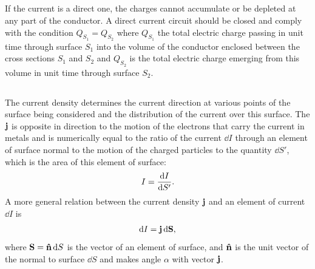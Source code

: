 \subsection{}\label{20.2.2} If the current is a direct one, the charges cannot accumulate or be depleted at any part of the conductor. A direct current circuit should be closed and comply with the condition $Q_{S_{1}} = Q_{S_{2}}$ where $Q_{S_{1}}$ the total electric charge passing in unit time through surface $S_{1}$ into the volume of the conductor enclosed between the cross sections $S_{1}$ and $S_{2}$ and $Q_{S_{2}}$ is the total electric charge emerging from this volume in unit time through surface $S_{2}$.

\subsection{}\label{20.2.3} The current density determines the current direction at various points of the surface being considered and the distribution of the current over this surface. The  $\vb{j}$ is opposite in direction to the motion of the electrons that carry the current in metals and is numerically equal to the ratio of the current $\dd I$ through an element of surface normal to the motion of the charged particles to the quantity $\dd S'$, which is the area of this element of surface:
\begin{equation*}%
I = \dv{I}{S'}.
\end{equation*}
A more general relation between the current density $\vb{j}$ and an element of current $\dd I$ is
\begin{equation*}%
\dd I = \vb{j} \, \dd \vb{S},
\end{equation*}
where $\vb{S} = \vu{n}\, \dd S$ is the vector of an element of surface, and $\vu{n}$ is the unit vector of the normal to surface $\dd S$ and makes angle $\alpha$ with vector $\vb{j}$.

